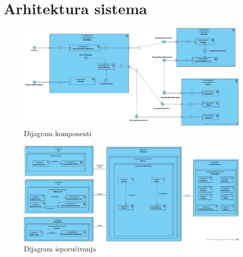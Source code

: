 \section{\bfseries Arhitektura sistema}





\begin{figure}[H]
	\begin{center}
		\includegraphics[width=\textwidth]{Pictures/component_diagram.jpg}
    		\caption{Dijagram komponenti}
    \label{fig:ComponentDiagram}
    \end{center}
\end{figure}


\begin{figure}[H]
	\begin{center}
		\includegraphics[width=\textwidth]{Pictures/deployment_diagram.jpg}
    		\caption{Dijagram isporučivanja}
    \label{fig:DeploymentDiagram}
    \end{center}
\end{figure}